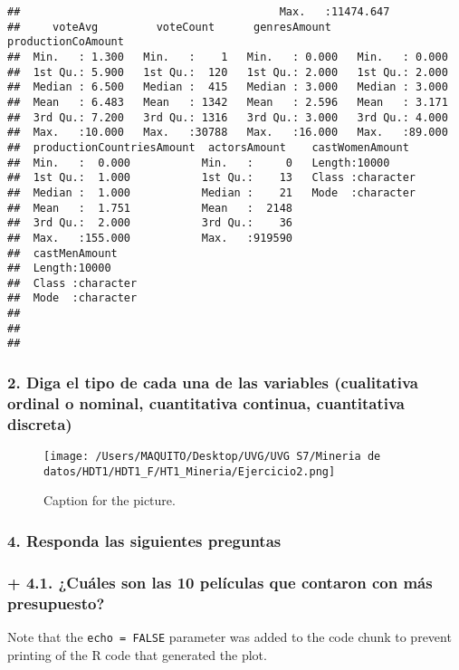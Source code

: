 \documentclass[
]{article}
\begin{document}
\begin{verbatim}
##                                        Max.   :11474.647                     
##     voteAvg         voteCount      genresAmount    productionCoAmount
##  Min.   : 1.300   Min.   :    1   Min.   : 0.000   Min.   : 0.000    
##  1st Qu.: 5.900   1st Qu.:  120   1st Qu.: 2.000   1st Qu.: 2.000    
##  Median : 6.500   Median :  415   Median : 3.000   Median : 3.000    
##  Mean   : 6.483   Mean   : 1342   Mean   : 2.596   Mean   : 3.171    
##  3rd Qu.: 7.200   3rd Qu.: 1316   3rd Qu.: 3.000   3rd Qu.: 4.000    
##  Max.   :10.000   Max.   :30788   Max.   :16.000   Max.   :89.000    
##  productionCountriesAmount  actorsAmount    castWomenAmount   
##  Min.   :  0.000           Min.   :     0   Length:10000      
##  1st Qu.:  1.000           1st Qu.:    13   Class :character  
##  Median :  1.000           Median :    21   Mode  :character  
##  Mean   :  1.751           Mean   :  2148                     
##  3rd Qu.:  2.000           3rd Qu.:    36                     
##  Max.   :155.000           Max.   :919590                     
##  castMenAmount     
##  Length:10000      
##  Class :character  
##  Mode  :character  
##                    
##                    
## 
\end{verbatim}

\hypertarget{diga-el-tipo-de-cada-una-de-las-variables-cualitativa-ordinal-o-nominal-cuantitativa-continua-cuantitativa-discreta}{%
\subsubsection{2. Diga el tipo de cada una de las variables (cualitativa
ordinal o nominal, cuantitativa continua, cuantitativa
discreta)}\label{diga-el-tipo-de-cada-una-de-las-variables-cualitativa-ordinal-o-nominal-cuantitativa-continua-cuantitativa-discreta}}

\begin{figure}
\centering
\texttt{[image: /Users/MAQUITO/Desktop/UVG/UVG S7/Mineria de datos/HDT1/HDT1\_F/HT1\_Mineria/Ejercicio2.png]}
\caption{Caption for the picture.}
\end{figure}

\hypertarget{responda-las-siguientes-preguntas}{%
\subsubsection{4. Responda las siguientes
preguntas}\label{responda-las-siguientes-preguntas}}

\hypertarget{cuuxe1les-son-las-10-peluxedculas-que-contaron-con-muxe1s-presupuesto}{%
\subsubsection{+ 4.1. ¿Cuáles son las 10 películas que contaron con más
presupuesto?}\label{cuuxe1les-son-las-10-peluxedculas-que-contaron-con-muxe1s-presupuesto}}

Note that the \texttt{echo\ =\ FALSE} parameter was added to the code
chunk to prevent printing of the R code that generated the plot.
\end{document}
